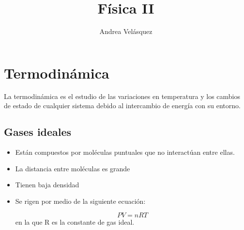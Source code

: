 \documentclass[12pt]{article}
\title{Física II}
\date{}
\author{Andrea Velásquez}
\begin{document}
\maketitle

\section*{Termodinámica}
La termodinámica es el estudio de las variaciones en temperatura y los cambios de estado de cualquier sistema debido al intercambio de energía con su entorno.
\subsection*{Gases ideales}
\begin{itemize}
\item Están compuestos por moléculas puntuales que no interactúan entre ellas.
\item La distancia entre moléculas es grande
\item Tienen baja densidad
\item Se rigen por medio de la siguiente ecuación:

\begin{equation}\label{eq:1.1}
\ PV = nRT
\end{equation}
en la que R es la constante de gas ideal. \\\\


\end{itemize}
\end{document}
